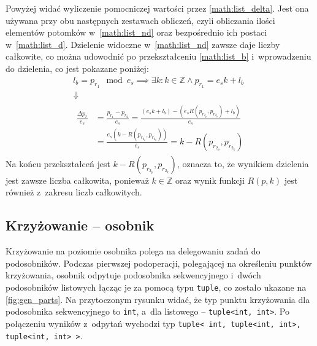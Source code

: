 Powyżej widać wyliczenie pomocniczej
wartości przez \cref{math:list_delta}.
Jest ona używana przy obu
następnych zestawach obliczeń,
czyli obliczania ilości elementów potomków
w~\cref{math:list_nd} oraz bezpośrednio
ich postaci w~\cref{math:list_d}.
Dzielenie widoczne w~\cref{math:list_nd}
zawsze daje liczby całkowite,
co można udowodnić po przekształceniu
\cref{math:list_b} i~wprowadzeniu do dzielenia,
co jest pokazane poniżej:
\begin{equation}
  \displaystyle
  \label{math:list_div_prove}
  \begin{gathered}
    \displaystyle
    l_b=p_{r_1} \mod e_s
      \implies \exists {
        k: k \in \mathbb{Z}
        \land p_{r_1}=e_s k + l_b
      }\\
    \Downarrow\\
    \begin{aligned}
      \frac{{\Delta p_r}}{e_s}
        &=\frac{p_{r_1} - p_{r_2}}{e_s}
        =\frac{
          \left(e_s k + l_b\right)
          - \left(
            e_s R\left(p_{r_{2_p}}, p_{r_{2_k}}\right)
            + l_b
          \right)
        }{e_s}\\
        &=\frac{
          e_s\left(
            k - R\left(p_{r_{2_p}}, p_{r_{2_k}}\right)
          \right)
        }{e_s}
        =k - R\left(p_{r_{2_p}}, p_{r_{2_k}}\right)
    \end{aligned}
  \end{gathered}
\end{equation}
Na końcu przekształceń jest
$k - R\left(p_{r_{2_p}}, p_{r_{2_k}}\right)$,
oznacza to, że wynikiem dzielenia
jest zawsze liczba całkowita,
ponieważ $k \in \mathbb{Z}$
oraz wynik funkcji $R\left(p, k\right)$
jest również z~zakresu liczb całkowitych.

\subsection{Krzyżowanie -- osobnik}
\label{subsec:crossover_ind}
Krzyżowanie na poziomie osobnika polega
na delegowaniu zadań do podosobników.
Podczas pierwszej podoperacji,
polegającej na określeniu punktów krzyżowania,
osobnik odpytuje podosobnika sekwencyjnego
i~dwóch podosobników listowych łącząc je
za pomocą typu \texttt{tuple},
co zostało ukazane na \cref{fig:gen_parts}.
Na przytoczonym rysunku widać,
że typ punktu krzyżowania
dla podosobnika sekwencyjnego
to \texttt{int}, a~dla listowego
-- \texttt{tuple{\textless}int, int{\textgreater}}.
Po połączeniu wyników z~odpytań wychodzi
typ \texttt{tuple{\textless}%
  int,
  tuple{\textless}int, int{\textgreater},
  tuple{\textless}int, int{\textgreater}%
{\textgreater}}.

